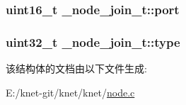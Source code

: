 \subsubsection[{port}]{\setlength{\rightskip}{0pt plus 5cm}uint16\+\_\+t \+\_\+node\+\_\+join\+\_\+t\+::port}\label{a00036_a1654e0e0747e2b7eac3710a655edb7a2_a1654e0e0747e2b7eac3710a655edb7a2}
\hypertarget{a00036_a62ba1229e457a867a69781489a0d654e_a62ba1229e457a867a69781489a0d654e}{}
\subsubsection[{type}]{\setlength{\rightskip}{0pt plus 5cm}uint32\+\_\+t \+\_\+node\+\_\+join\+\_\+t\+::type}\label{a00036_a62ba1229e457a867a69781489a0d654e_a62ba1229e457a867a69781489a0d654e}


该结构体的文档由以下文件生成\+:\begin{DoxyCompactItemize}
\item 
E\+:/knet-\/git/knet/knet/\hyperlink{a00101}{node.\+c}\end{DoxyCompactItemize}
